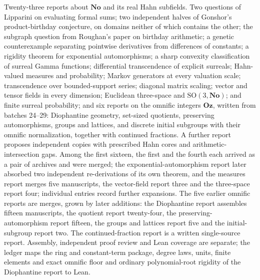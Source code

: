\documentclass[11pt]{article}
\newcommand{\No}{\mathbf{No}}
\newcommand{\Oz}{\mathbf{Oz}}
\begin{document}
Twenty-three reports about $\No$ and its real Hahn subfields.  Two questions of
Lipparini on evaluating formal sums; two independent halves of Gonshor's
product-birthday conjecture, on domains neither of which contains the other;
the subgraph question from Roughan's paper on birthday arithmetic; a genetic
counterexample separating pointwise derivatives from differences of
constants; a rigidity theorem for exponential automorphisms; a sharp
convexity classification of surreal Gamma functions; differential
transcendence of explicit surreals; Hahn-valued measures and probability;
Markov generators at every valuation scale; transcendence over bounded-support
series; diagonal matrix scaling; vector and tensor fields in every
dimension; Euclidean three-space and $\mathrm{SO}(3,\No)$; and finite surreal
probability; and six reports on the omnific integers $\Oz$, written from
batches 24--29: Diophantine geometry, set-sized quotients, preserving
automorphisms, groups and lattices, and discrete initial subgroups with their
omnific normalization, together with continued fractions. A further report proposes independent copies with
prescribed Hahn cores and arithmetic-intersection gaps. Among the first sixteen, the first and the fourth
each arrived as a pair of archives and were merged; the exponential-automorphism
report later absorbed two independent re-derivations of its own theorem, and
the measures report merges five manuscripts, the vector-field report three
and the three-space report four; individual entries record further expansions.
The five earlier omnific reports are merges, grown by later additions: the
Diophantine report assembles fifteen manuscripts, the quotient report
twenty-four, the preserving-automorphism report fifteen, the groups and lattices
report five and the initial-subgroup report two. The continued-fraction report
is a written single-source report. Assembly, independent proof
review and Lean coverage are separate; the ledger maps the ring and
constant-term package, degree laws, units, finite elements and exact
omnific floor and ordinary polynomial-root rigidity of the Diophantine
report to Lean.
\end{document}

